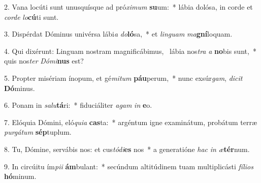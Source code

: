 2. Vana locúti sunt unusquísque ad pró\textit{xi}\textit{mum} \textbf{su}um:~*  lábia dolósa, in corde et \textit{cor}\textit{de} \textit{lo}\textbf{cú}ti sunt.\

3. Dispérdat Dóminus univérsa lábi\textit{a} \textit{do}\textbf{ló}sa,~*  et \textit{lin}\textit{guam} \textit{ma}\textbf{gní}loquam.\

4. Qui dixérunt: Linguam nostram magnificábimus, \dag\  lábia nos\textit{tra} \textit{a} \textbf{no}bis sunt,~*  quis nos\textit{ter} \textit{Dó}\textit{mi}\textbf{nus} est?\

5. Propter misériam ínopum, et gé\textit{mi}\textit{tum} \textbf{páu}perum,~*  nunc exsúr\textit{gam}, \textit{di}\textit{cit} \textbf{Dó}minus.\

6. Ponam in \textit{sa}\textit{lu}\textbf{tá}ri:~*  fiduciáliter \textit{a}\textit{gam} \textit{in} \textbf{e}o.\

7. Elóquia Dómini, eló\textit{qui}\textit{a} \textbf{cas}ta:~*  argéntum igne examinátum, probátum terræ \textit{pur}\textit{gá}\textit{tum} \textbf{sép}tuplum.\

8. Tu, Dómine, servábis nos: et cus\textit{tó}\textit{di}\textbf{es} nos~*  a generatióne \textit{hac} \textit{in} \textit{æ}\textbf{tér}num.\

9. In circúitu ím\textit{pi}\textit{i} \textbf{ám}bulant:~*  secúndum altitúdinem tuam multiplicásti \textit{fí}\textit{li}\textit{os} \textbf{hó}minum.\

